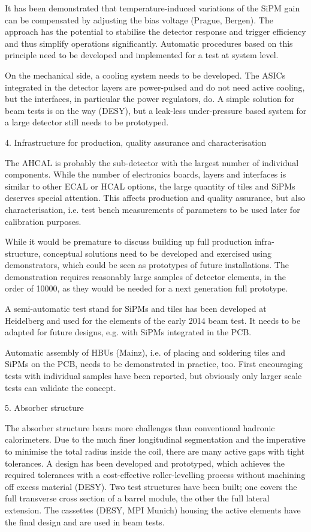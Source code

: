 It has been demonstrated that temperature-induced variations of the SiPM gain can be compensated by adjusting the bias voltage (Prague, Bergen). The approach has the potential to stabilise the detector response and trigger efficiency and thus simplify operations significantly. Automatic procedures based on this principle need to be developed and implemented for a test at system level.

On the mechanical side, a cooling system needs to be developed. The ASICs integrated in the detector layers are power-pulsed and do not need active cooling, but the interfaces, in particular the power regulators, do. A simple solution for beam tests is on the way (DESY), but a leak-less under-pressure based system for a large detector still needs to be prototyped.

4.  Infrastructure for production, quality assurance and characterisation

The AHCAL is probably the sub-detector with the largest number of individual components. While the number of electronics boards, layers and interfaces is similar to other ECAL or HCAL options, the large quantity of tiles and SiPMs deserves special attention. This affects production and quality assurance, but also characterisation, i.e. test bench measurements of parameters to be used later for calibration purposes.

While it would be premature to discuss building up full production infra-structure, conceptual solutions need to be developed and exercised using demonstrators, which could be seen as prototypes of future installations. The demonstration requires reasonably large samples of detector elements, in the order of 10000, as they would be needed for a next generation full prototype.

A semi-automatic test stand for SiPMs and tiles has been developed at Heidelberg and used for the elements of the early 2014 beam test. It needs to be adapted for future designs, e.g. with SiPMs integrated in the PCB.

Automatic assembly of HBUs (Mainz), i.e. of placing and soldering tiles and SiPMs on the PCB, needs to be demonstrated in practice, too. First encouraging tests with individual samples have been reported, but obviously only larger scale tests can validate the concept.

5.  Absorber structure

The absorber structure bears more challenges than conventional hadronic calorimeters. Due to the much finer longitudinal segmentation and the imperative to minimise the total radius inside the coil, there are many active gaps with tight tolerances. A design has been developed and prototyped, which achieves the required tolerances with a cost-effective roller-levelling process without machining off excess material (DESY). Two test structures have been built; one covers the full transverse cross section of a barrel module, the other the full lateral extension. The cassettes (DESY, MPI Munich) housing the active elements have the final design and are used in beam tests.

